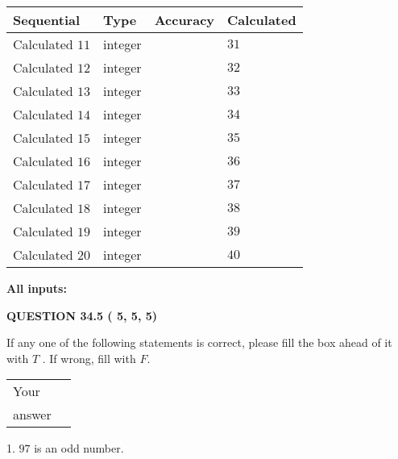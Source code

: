 \documentclass[12pt]{article}
\begin{document}
   
  
  
\noindent\begin{tabular}{|l|l|l|l|}
\hline
 Sequential & Type & Accuracy & Calculated \\ 
\hline
 
 
  Calculated $          11$ & integer &  & 
  $ 31 $ 
 \\  \hline  
 
 
  Calculated $          12$ & integer &  & 
  $ 32 $ 
 \\  \hline  
 
 
  Calculated $          13$ & integer &  & 
  $ 33 $ 
 \\  \hline  
 
 
  Calculated $          14$ & integer &  & 
  $ 34 $ 
 \\  \hline  
 
 
  Calculated $          15$ & integer &  & 
  $ 35 $ 
 \\  \hline  
 
 
  Calculated $          16$ & integer &  & 
  $ 36 $ 
 \\  \hline  
 
 
  Calculated $          17$ & integer &  & 
  $ 37 $ 
 \\  \hline  
 
 
  Calculated $          18$ & integer &  & 
  $ 38 $ 
 \\  \hline  
 
 
  Calculated $          19$ & integer &  & 
  $ 39 $ 
 \\  \hline  
 
 
  Calculated $          20$ & integer &  & 
  $ 40 $ 
 \\  \hline  
 \end{tabular}
   
   
   
   
\noindent\vspace{0.1in}\hspace{-0.08in} {\textbf{\Large{All inputs: }}}
   
   
  
\vspace{0.2in}
  
{\textbf{\Large{QUESTION
34.5 
 (          5,          5,          5)
}}}
  
  
If any one of the following statements is correct, please fill the box ahead of it with $T$ .
If wrong, fill with $F$.
 
\noindent\begin{tabular}{|l|l|}\hline Your&\hspace{.2in} \\ answer&\hspace{.2in} \\ \hline \end{tabular}
1. $ %
97$ is an  %
odd number.
 
\end{document}
